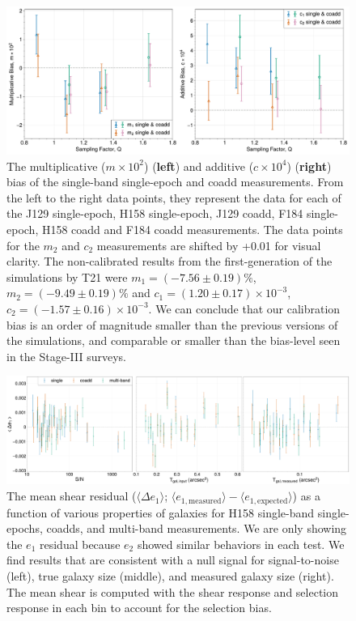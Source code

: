 \documentclass[fleqn,usenatbib]{mnras}
\begin{document}
\begin{figure}
	\includegraphics[width=\textwidth]{final_result_v4_pplt.pdf}
    \caption{The multiplicative ($m \times 10^2$) (\textbf{left}) and additive ($c \times 10^4$) (\textbf{right}) bias of the single-band single-epoch and coadd measurements. From the left to the right data points, they represent the data for each of the J129 single-epoch, H158 single-epoch, J129 coadd, F184 single-epoch, H158 coadd and F184 coadd measurements. The data points for the $m_2$ and $c_2$ measurements are shifted by +0.01 for visual clarity. The non-calibrated results from the first-generation of the simulations by T21 were $m_1=(-7.56\pm0.19)\%$, $m_2=(-9.49\pm0.19)\%$ and $c_1=(1.20\pm0.17)\times10^{-3}$, $c_2=(-1.57\pm0.16)\times10^{-3}$. We can conclude that our calibration bias is an order of magnitude smaller than the previous versions of the simulations, and comparable or smaller than the bias-level seen in the Stage-III surveys.}
    \label{fig:final_result}
\end{figure}

\begin{figure}
    \centering
	\includegraphics[width=\textwidth]{H158_meanshear_measured_properties_perbin_e1_v6_pplt.pdf}
    \caption{The mean shear residual ($\langle \Delta e_{1} \rangle$; $\langle e_{1,\text{measured}} \rangle - \langle e_{1,\text{expected}} \rangle$) as a function of various properties of galaxies for H158 single-band single-epochs, coadds, and multi-band measurements. We are only showing the $e_1$ residual because $e_{2}$ showed similar behaviors in each test. We find results that are consistent with a null signal for signal-to-noise (left), true galaxy size (middle), and measured galaxy size (right). The mean shear is computed with the shear response and selection response in each bin to account for the selection bias.}
    \label{fig:meanshear}
\end{figure}
\end{document}

